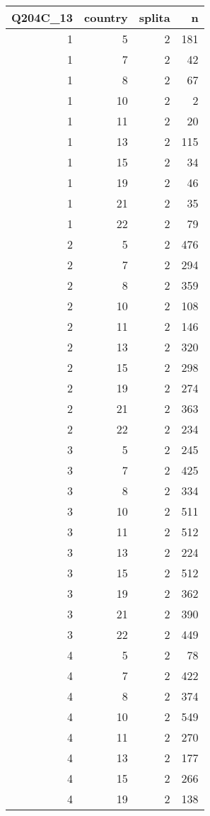 \documentclass[]{article}
\begin{document}
\begin{tabular}{r|r|r|r}
\hline
Q204C\_13 & country & splita & n\\
\hline
1 & 5 & 2 & 181\\
\hline
1 & 7 & 2 & 42\\
\hline
1 & 8 & 2 & 67\\
\hline
1 & 10 & 2 & 2\\
\hline
1 & 11 & 2 & 20\\
\hline
1 & 13 & 2 & 115\\
\hline
1 & 15 & 2 & 34\\
\hline
1 & 19 & 2 & 46\\
\hline
1 & 21 & 2 & 35\\
\hline
1 & 22 & 2 & 79\\
\hline
2 & 5 & 2 & 476\\
\hline
2 & 7 & 2 & 294\\
\hline
2 & 8 & 2 & 359\\
\hline
2 & 10 & 2 & 108\\
\hline
2 & 11 & 2 & 146\\
\hline
2 & 13 & 2 & 320\\
\hline
2 & 15 & 2 & 298\\
\hline
2 & 19 & 2 & 274\\
\hline
2 & 21 & 2 & 363\\
\hline
2 & 22 & 2 & 234\\
\hline
3 & 5 & 2 & 245\\
\hline
3 & 7 & 2 & 425\\
\hline
3 & 8 & 2 & 334\\
\hline
3 & 10 & 2 & 511\\
\hline
3 & 11 & 2 & 512\\
\hline
3 & 13 & 2 & 224\\
\hline
3 & 15 & 2 & 512\\
\hline
3 & 19 & 2 & 362\\
\hline
3 & 21 & 2 & 390\\
\hline
3 & 22 & 2 & 449\\
\hline
4 & 5 & 2 & 78\\
\hline
4 & 7 & 2 & 422\\
\hline
4 & 8 & 2 & 374\\
\hline
4 & 10 & 2 & 549\\
\hline
4 & 11 & 2 & 270\\
\hline
4 & 13 & 2 & 177\\
\hline
4 & 15 & 2 & 266\\
\hline
4 & 19 & 2 & 138\\

\end{tabular}
\end{document}
